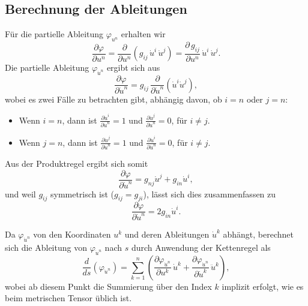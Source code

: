 \subsection{Berechnung der Ableitungen}
Für die partielle Ableitung $\varphi_{u^n}$ erhalten wir
\begin{equation} 
	\frac{\partial \varphi}{\partial u^n} = \frac{\partial}{\partial u^n} \left(g_{i\!j} \, \dot{u}^i \, \dot{u}^j\right) = \frac{\partial \, g_{i\!j}}{\partial u^n} \, \dot{u}^i \, \dot{u}^j. 
	\label{geodaeten:equation:StandardverfahrenGeodaeten:PartialPhi1}
\end{equation}
Die partielle Ableitung $\varphi_{\dot{u}^n}$ ergibt sich aus
\begin{equation}
	\frac{\partial \varphi}{\partial \dot{u}^n} = g_{i\!j} \, \frac{\partial}{\partial \dot{u}^n} \left( \dot{u}^i \dot{u}^j \right),
\end{equation}
wobei es zwei Fälle zu betrachten gibt, abhängig davon, ob $i = n$ oder $j = n$:
\begin{itemize}
	\item Wenn $i = n$, dann ist $\frac{\partial \dot{u}^i}{\partial \dot{u}^n} = 1$ und $\frac{\partial \dot{u}^j}{\partial \dot{u}^n} = 0$, für $i \neq j$.
	\item Wenn $j = n$, dann ist $\frac{\partial \dot{u}^j}{\partial \dot{u}^n} = 1$ und $\frac{\partial \dot{u}^i}{\partial \dot{u}^n} = 0$, für $i \neq j$.
\end{itemize}
Aus der Produktregel ergibt sich somit
\begin{equation}
	\frac{\partial \varphi}{\partial \dot{u}^n} = g_{nj} \dot{u}^j + g_{in} \dot{u}^i,
\end{equation}
und weil $g_{i\!j}$ symmetrisch ist ($g_{i\!j} = g_{ji}$), lässt sich dies zusammenfassen zu
\begin{equation}
	\frac{\partial \varphi}{\partial \dot{u}^n} = 2g_{in} \dot{u}^i.
	\label{geodaeten:equation:StandardverfahrenGeodaeten:PartialPhi2}
\end{equation}

Da $\varphi_{\dot{u}^n}$ von den Koordinaten $u^k$ und deren Ableitungen $\dot{u}^k$ abhängt, berechnet sich die Ableitung von $\varphi_{\dot{u}^n}$ nach $s$ durch Anwendung der Kettenregel als
\begin{equation}
	\frac{d}{ds} \left( \varphi_{\dot{u}^n} \right) = \sum_{k = 1}^n \left( \frac{\partial \varphi_{\dot{u}^n}}{\partial u^k} \, \dot{u}^k + \frac{\partial \varphi_{\dot{u}^n}}{\partial \dot{u}^k} \, \ddot{u}^k \right),
	\label{geodaeten:equation:StandardverfahrenGeodaeten:Ableitung1s}
\end{equation}
wobei ab diesem Punkt die Summierung über den Index $k$ implizit erfolgt, wie es beim metrischen Tensor üblich ist.

